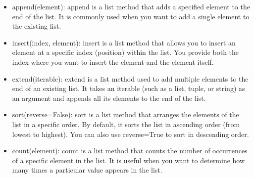 \documentclass[11pt]{article}
\begin{document}
\begin{itemize}
\item
  append(element): append is a list method that adds a specified element
  to the end of the list. It is commonly used when you want to add a
  single element to the existing list.
\item
  insert(index, element): insert is a list method that allows you to
  insert an element at a specific index (position) within the list. You
  provide both the index where you want to insert the element and the
  element itself.
\item
  extend(iterable): extend is a list method used to add multiple
  elements to the end of an existing list. It takes an iterable (such as
  a list, tuple, or string) as an argument and appends all its elements
  to the end of the list.
\item
  sort(reverse=False): sort is a list method that arranges the elements
  of the list in a specific order. By default, it sorts the list in
  ascending order (from lowest to highest). You can also use
  reverse=True to sort in descending order.
\item
  count(element): count is a list method that counts the number of
  occurrences of a specific element in the list. It is useful when you
  want to determine how many times a particular value appears in the
  list.
\end{itemize}
\end{document}
